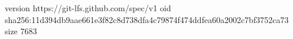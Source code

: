 version https://git-lfs.github.com/spec/v1
oid sha256:11d394db9aae661e3f82c8d738dfa4c79874f474ddfea60a2002c7bf3752ca73
size 7683
